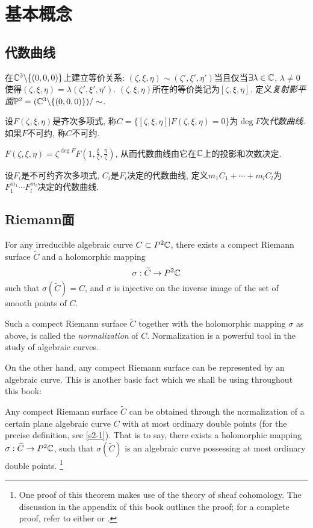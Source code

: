 \chapter{基本概念}\label{c1}
\section{代数曲线}\label{s1-1}
\begin{definition}
    在$\mathbb{C}^3\backslash\{(0,0,0)\}$上建立等价关系: $(\zeta,\xi,\eta)\sim(\zeta',\xi',\eta')$当且仅当$\exists\lambda\in\mathbb{C}$, $\lambda\neq0$使得$(\zeta,\xi,\eta)=\lambda(\zeta',\xi',\eta')$. $(\zeta,\xi,\eta)$所在的等价类记为$[\zeta,\xi,\eta]$. 定义\textit{复射影平面}$\mathbb{P}^2=(\mathbb{C}^3\backslash\{(0,0,0)\})/\sim$. 
\end{definition}
\begin{definition}
    设$F(\zeta,\xi,\eta)$是齐次多项式, 称$C=\{[\zeta,\xi,\eta]|F(\zeta,\xi,\eta)=0\}$为$\deg F$次\textit{代数曲线}. 如果$F$不可约, 称$C$不可约. 
\end{definition}
\begin{remark}$F(\zeta,\xi,\eta)=\zeta^{\deg F}F(1,\frac\xi\zeta,\frac\eta\zeta)$, 从而代数曲线由它在$\mathbb{C}$上的投影和次数决定. 
\end{remark}
\begin{definition}
    设$F_i$是不可约齐次多项式, $C_i$是$F_i$决定的代数曲线, 定义$m_1C_1+\cdots+m_l C_l$为$F_1^{m_1}\cdots F_l^{m_l}$决定的代数曲线. 
\end{definition}
\section{Riemann面}\label{s1-2}
\begin{theorem}
    For any irreducible algebraic curve $C\subset P^2\mathbb{C}$, there exists a compect Riemann surface $\widetilde{C}$ and a holomorphic mapping 
    \[\sigma:\widetilde{C}\to P^2\mathbb{C}\]
    such that $\sigma(\widetilde{C})=C$, and $\sigma$ is injective on the inverse image of the set of smooth points of $C$. 
\end{theorem}

Such a compect Riemann surface $\widetilde{C}$ together with the holomorphic mapping $\sigma$ as above, is called the \textit{normalization} of $C$. Normalization is a powerful tool in the study of algebraic curves. 

On the other hand, any compect Riemann surface can be represented by an algebraic curve. This is another basic fact which we shall be using throughout this book: 
\begin{theorem}
    Any compect Riemann surface $\widetilde{C}$ can be obtained through the normalization of a certain plane algebraic curve $C$ with at most ordinary double points (for the precise definition, see \autoref{s2-1}). That is to say, there exists a holomorphic mapping $\sigma:\widetilde{C}\to P^2\mathbb{C}$, such that $\sigma(\widetilde{C})$ is an algebraic curve possessing at most ordinary double points. \footnote{One proof of this theorem makes use of the theory of sheaf cohomology. The discussion in the appendix of this book outlines the proof; for a complete proof, refer to either \cite[chapter 2]{MR1288523} or \cite[section 5.21]{MR703513}.}
\end{theorem}

